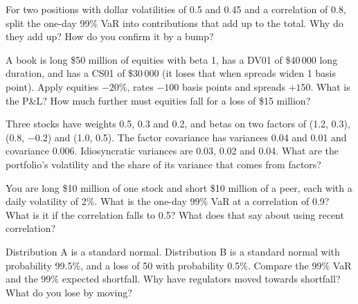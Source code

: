 \begin{question}\label{iq:iv2:risk-validation-and-regulation:17}
For two positions with dollar volatilities of 0.5 and 0.45 and a correlation of 0.8, split the one-day 99\% VaR into contributions that add up to the total. Why do they add up? How do you confirm it by a bump?
\end{question}

\begin{question}\label{iq:iv2:risk-validation-and-regulation:18}
A book is long \$50 million of equities with beta 1, has a DV01 of \$40\,000 long duration, and has a CS01 of \$30\,000 (it loses that when spreads widen 1 basis point). Apply equities $-20\%$, rates $-100$ basis points and spreads $+150$. What is the P\&L? How much further must equities fall for a loss of \$15 million?
\end{question}

\begin{question}\label{iq:iv2:risk-validation-and-regulation:19}
Three stocks have weights 0.5, 0.3 and 0.2, and betas on two factors of (1.2, 0.3), (0.8, $-0.2$) and (1.0, 0.5). The factor covariance has variances 0.04 and 0.01 and covariance 0.006. Idiosyncratic variances are 0.03, 0.02 and 0.04. What are the portfolio's volatility and the share of its variance that comes from factors?
\end{question}

\begin{question}\label{iq:iv2:risk-validation-and-regulation:20}
You are long \$10 million of one stock and short \$10 million of a peer, each with a daily volatility of 2\%. What is the one-day 99\% VaR at a correlation of 0.9? What is it if the correlation falls to 0.5? What does that say about using recent correlation?
\end{question}

\begin{question}\label{iq:iv2:risk-validation-and-regulation:21}
Distribution A is a standard normal. Distribution B is a standard normal with probability 99.5\%, and a loss of 50 with probability 0.5\%. Compare the 99\% VaR and the 99\% expected shortfall. Why have regulators moved towards shortfall? What do you lose by moving?
\end{question}

